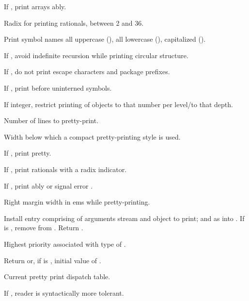 \begin{LIST}{1cm}
  {
  If \T, print arrays ably.
  }

  {
  Radix for printing rationals, between 2 and 36.
  }

  {
  Print symbol names all uppercase (), all lowercase
  (), capitalized ().
  }

  {
  If \T, avoid indefinite recursion while printing circular
  structure. 
  }

  {
  If \NIL, do not print escape characters and package prefixes.
  }

  {
  If \T, print \kwd{:\#} before uninterned symbols.
  }

  {
  If integer, restrict printing of objects to that number per
  level/to that depth.
  }

  {
  Number of lines to pretty-print.
  }

  {
  Width below which a compact pretty-printing style is used.
  }

  {
  If \T, print pretty.
  }

  {
  If \T, print rationals with a radix indicator.
  }

  {
  If \T, print ably or signal error
  . 
  }

  {
  Right margin width in ems while pretty-printing.
  }

  {
  Install entry comprising  of arguments stream and
  object to print; and  as
   into . If 
  is \NIL, remove  from . Return \retval{\NIL}. 
  }

  {
  Highest priority  associated with type of
  . 
  }

  {
  Return  or, if  is \NIL,
  initial value of .
  }

  {
  Current pretty print dispatch table.
  }

  {
  If \T, reader is syntactically more tolerant.
  }

\end{LIST}



